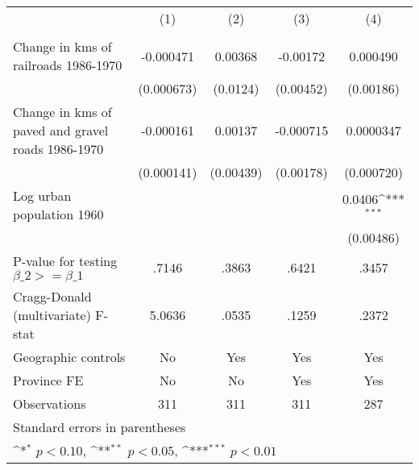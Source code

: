 {
\def\sym#1{\ifmmode^{#1}\else\(^{#1}\)\fi}
\begin{tabular}{l*{4}{c}}
\hline\hline
                &\multicolumn{1}{c}{(1)}&\multicolumn{1}{c}{(2)}&\multicolumn{1}{c}{(3)}&\multicolumn{1}{c}{(4)}\\
                &\multicolumn{1}{c}{}&\multicolumn{1}{c}{}&\multicolumn{1}{c}{}&\multicolumn{1}{c}{}\\
\hline
Change in kms of railroads 1986-1970&-0.000471         &  0.00368         & -0.00172         & 0.000490         \\
                &(0.000673)         & (0.0124)         &(0.00452)         &(0.00186)         \\
[1em]
Change in kms of paved and gravel roads 1986-1970&-0.000161         &  0.00137         &-0.000715         &0.0000347         \\
                &(0.000141)         &(0.00439)         &(0.00178)         &(0.000720)         \\
[1em]
Log urban population 1960&                  &                  &                  &   0.0406\sym{***}\\
                &                  &                  &                  &(0.00486)         \\
\hline
P-value for testing $\beta\_{2} >= \beta\_{1}$&    .7146         &    .3863         &    .6421         &    .3457         \\
Cragg-Donald (multivariate) F-stat&   5.0636         &    .0535         &    .1259         &    .2372         \\
Geographic controls&       No         &      Yes         &      Yes         &      Yes         \\
Province FE     &       No         &       No         &      Yes         &      Yes         \\
Observations    &      311         &      311         &      311         &      287         \\
\hline\hline
\multicolumn{5}{l}{\footnotesize Standard errors in parentheses}\\
\multicolumn{5}{l}{\footnotesize \sym{*} \(p<0.10\), \sym{**} \(p<0.05\), \sym{***} \(p<0.01\)}\\
\end{tabular}
}
